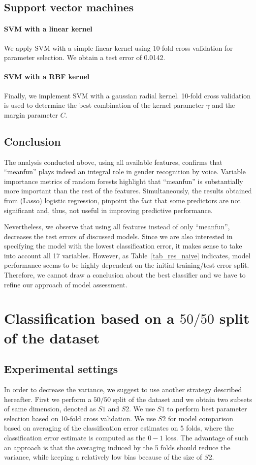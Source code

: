 \subsection{Support vector machines}
\paragraph{SVM with a linear kernel}
We apply SVM with a simple linear kernel using \num{10}-fold cross validation for parameter selection. We obtain a test error of \num{0.0142}.
\paragraph{SVM with a RBF kernel}
Finally, we implement SVM with a gaussian radial kernel. \num{10}-fold cross validation is used to determine the best combination of the kernel parameter $ \gamma $ and the margin parameter $C$. 
\subsection{Conclusion}
The analysis conducted above, using all available features, confirms that ``meanfun'' plays indeed an integral role in gender recognition by voice. Variable importance metrics of random forests highlight that ``meanfun'' is substantially more important than the rest of the features. Simultaneously, the results obtained from (Lasso) logistic regression, pinpoint the fact that some predictors are not significant and, thus, not useful in improving predictive performance.

Nevertheless, we observe that using all features instead of only ``meanfun'', decreases the test errors of discussed models. Since we are also interested in specifying the model with the lowest classification error, it makes sense to take into account all \num{17} variables. However, as Table~\ref{tab_res_naive} indicates, model performance seems to be highly dependent on the initial training/test error split. Therefore, we cannot draw a conclusion about the best classifier and we have to refine our approach of model assessment.
\section{Classification based on a $50/50$ split of the dataset}
\label{sec_our_strat}
\subsection{Experimental settings}
In order to decrease the variance, we suggest to use another strategy described hereafter. 
First we perform a $50/50$ split of the dataset and we obtain two subsets of same dimension, denoted as $S1$ and $S2$.
We use $S1$ to perform best parameter selection based on \num{10}-fold cross validation.
We use $S2$ for model comparison based on averaging of the classification error estimates on \num{5} folds, where the classification error estimate is computed as the $0-1$ loss. 
The advantage of such an approach is that the averaging induced by the \num{5} folds should reduce the variance, while keeping a relatively low bias because of the size of $S2$. 

